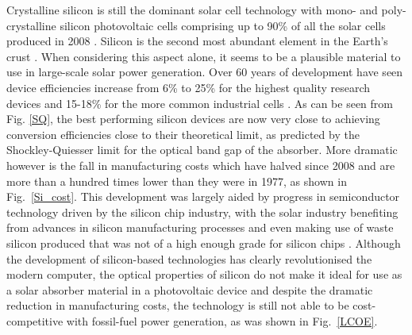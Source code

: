 \documentclass[11pt, twoside]{report}
\begin{document}
Crystalline silicon is still the dominant solar cell technology with mono- and poly-crystalline silicon photovoltaic cells comprising up to 90\% of all the solar cells produced in 2008  \cite{Si_rev}. Silicon is the second most abundant element in the Earth's crust \cite{Si_abundance}. When considering this aspect alone, it seems to be a plausible material to use in large-scale solar power generation. Over 60 years of development have seen device efficiencies increase from 6\% to 25\% for the highest quality research devices and 15-18\% for the more common industrial cells \cite{Si_rev}. As can be seen from Fig. \ref{SQ}, the best performing silicon devices are now very close to achieving conversion efficiencies close to their theoretical limit, as predicted by the Shockley-Quiesser limit \cite{SQ_1961} for the optical band gap of the absorber. More dramatic however is the fall in manufacturing costs which have halved since 2008 and are more than a hundred times lower than they were in 1977, as shown in Fig.~\ref{Si_cost}. This development was largely aided by progress in semiconductor technology driven by the silicon chip industry, with the solar industry benefiting from advances in silicon manufacturing processes and even making use of waste silicon produced that was not of a high enough grade for silicon chips \cite{PV_history1}. Although the development of silicon-based technologies has clearly revolutionised the modern computer, the optical properties of silicon do not make it ideal for use as a solar absorber material in a photovoltaic device and despite the dramatic reduction in manufacturing costs, the technology is still not able to be cost-competitive with fossil-fuel power generation, as was shown in Fig.~\ref{LCOE}.
\end{document}
